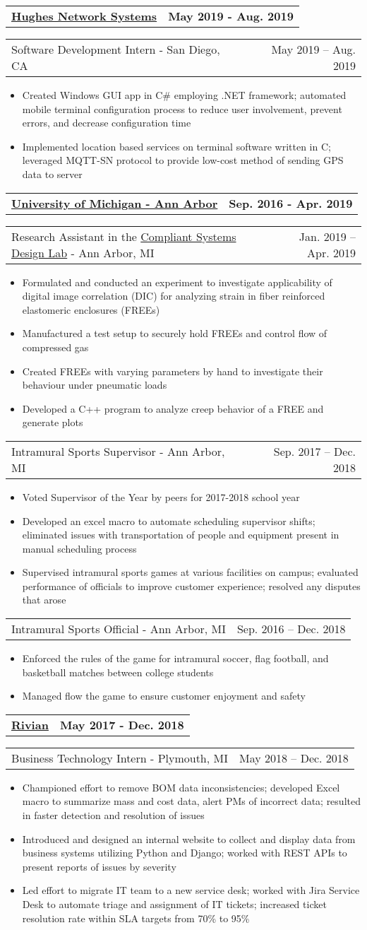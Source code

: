 \documentclass[letterpaper,11pt]{article}
\makeatletter
\newcommand{\resumeItem}[1]{
	\item\small{
		#1
	}
}
\newcommand{\resumeCompanyHeading}[2]{
  \vspace{-1pt}\item
    \begin{tabular*}{0.97\textwidth}[t]{l@{\extracolsep{\fill}}r}
      \textbf{#1} & \textbf{#2} \\
    \end{tabular*}\vspace{-0pt}
}
\newcommand{\resumeJobHeading}[3]{
	\vspace{-1pt}
	\begin{tabular*}{0.97\textwidth}[t]{l@{\extracolsep{\fill}}r}
		{\small#1} - {\small #2} & {\small #3} \\
	\end{tabular*}\vspace{-4pt}
}
\newcommand{\resumeItemListStart}{\begin{itemize}}
\newcommand{\resumeItemListEnd}{\end{itemize}\vspace{-4pt}}
\makeatother
\begin{document}
\resumeCompanyHeading{\href{https://www.hughes.com/}{Hughes Network Systems}}{May 2019 - Aug. 2019}
\resumeJobHeading{Software Development Intern}{San Diego, CA}{May 2019 -- Aug. 2019}
\resumeItemListStart
\resumeItem{Created Windows GUI app in C\# employing .NET framework; automated mobile terminal configuration process to reduce user involvement, prevent errors, and decrease configuration time}
\resumeItem{Implemented location based services on terminal software written in C; leveraged MQTT-SN protocol to provide low-cost method of sending GPS data to server}
\resumeItemListEnd

\resumeCompanyHeading{\href{https://umich.edu/}{University of Michigan - Ann Arbor}}{Sep. 2016 - Apr. 2019}
\resumeJobHeading{Research Assistant in the \href{http://csdl.engin.umich.edu/}{Compliant Systems Design Lab}}{Ann Arbor, MI}{Jan. 2019 -- Apr. 2019}
\resumeItemListStart
\resumeItem{Formulated and conducted an experiment to investigate applicability of digital image correlation (DIC) for analyzing strain in fiber reinforced elastomeric enclosures (FREEs)}
\resumeItem{Manufactured a test setup to securely hold FREEs and control flow of compressed gas}
\resumeItem{Created FREEs with varying parameters by hand to investigate their behaviour under pneumatic loads}
\resumeItem{Developed a C++ program to analyze creep behavior of a FREE and generate plots}
\resumeItemListEnd

\resumeJobHeading{Intramural Sports Supervisor}{Ann Arbor, MI}{Sep. 2017 -- Dec. 2018}
\resumeItemListStart
\resumeItem{Voted Supervisor of the Year by peers for 2017-2018 school year}
\resumeItem{Developed an excel macro to automate scheduling supervisor shifts; eliminated issues with transportation of people and equipment present in manual scheduling process}
\resumeItem{Supervised intramural sports games at various facilities on campus; evaluated performance of officials to improve customer experience; resolved any disputes that arose}
\resumeItemListEnd

\resumeJobHeading{Intramural Sports Official}{Ann Arbor, MI}{Sep. 2016 -- Dec. 2018}
\resumeItemListStart
\resumeItem{Enforced the rules of the game for intramural soccer, flag football, and basketball matches between college students}
\resumeItem{Managed flow the game to ensure customer enjoyment and safety}
\resumeItemListEnd

\resumeCompanyHeading{\href{https://rivian.com/}{Rivian}}{May 2017 - Dec. 2018}
\resumeJobHeading{Business Technology Intern}{Plymouth, MI}{May 2018 -- Dec. 2018}
\resumeItemListStart
\resumeItem{Championed effort to remove BOM data inconsistencies; developed Excel macro to summarize mass and cost data, alert PMs of incorrect data; resulted in faster detection and resolution of issues}
\resumeItem{Introduced and designed an internal website to collect and display data from business systems utilizing Python and Django; worked with REST APIs to present reports of issues by severity}
\resumeItem{Led effort to migrate IT team to a new service desk; worked with Jira Service Desk to automate triage and assignment of IT tickets; increased ticket resolution rate within SLA targets from 70\% to 95\%}
\resumeItemListEnd
\end{document}
